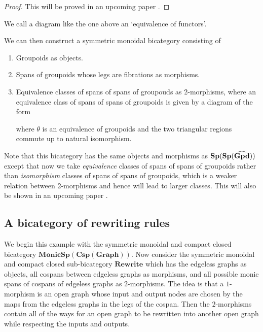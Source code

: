 \documentclass[11pt]{amsart}
\newcommand{\cat}[1]{\mathbf{#1}}
\newcommand{\bimonspcsp}[1]{\mathbf{MonicSp(Csp(#1))}}
\theoremstyle{remark}
\theoremstyle{definition}
\begin{document}
\begin{proof}
This will be proved in an upcoming paper \cite{CicCour}.
\end{proof}
We call a diagram like the one above an `equivalence of functors'.

We can then construct a symmetric monoidal bicategory consisting of
\begin{enumerate}
\item{Groupoids as objects.}
\item{Spans of groupoids whose legs are fibrations as morphisms.}
\item{Equivalence classes of spans of spans of groupouds as 2-morphisms, where an equivalence class of spans of spans of groupoids is given by a diagram of the form
\begin{center}
\end{center}
where $\theta$ is an equivalence of groupoids and the two triangular regions commute up to natural isomorphism.}
\end{enumerate}
Note that this bicategory has the same objects and morphisms as $\bold{Sp(Sp(\widehat{Gpd}))}$ except that now we take \emph{equivalence} classes of spans of spans of groupoids rather than \emph{isomorphism} classes of spans of spans of groupoids, which is a weaker relation between 2-morphisms and hence will lead to larger classes. This will also be shown in an upcoming paper \cite{CicCour}.

\subsection{A bicategory of rewriting rules} %
\label{subsec:Rewrite}

We begin this example with the symmetric monoidal and compact closed bicategory $\bimonspcsp{Graph}$.  Now consider the symmetric monoidal and compact closed sub-bicategory $\cat{Rewrite}$ which has the edgeless graphs as objects, all cospans between edgeless graphs as morphisms, and all possible monic spans of cospans of edgeless graphs as $2$-morphisms.  The idea is that a $1$-morphism is an open graph whose input and output nodes are chosen by the maps from the edgeless graphs in the legs of the cospan. Then the $2$-morphisms contain all of the ways for an open graph to be rewritten into another open graph while respecting the inputs and outputs. 
\end{document}
